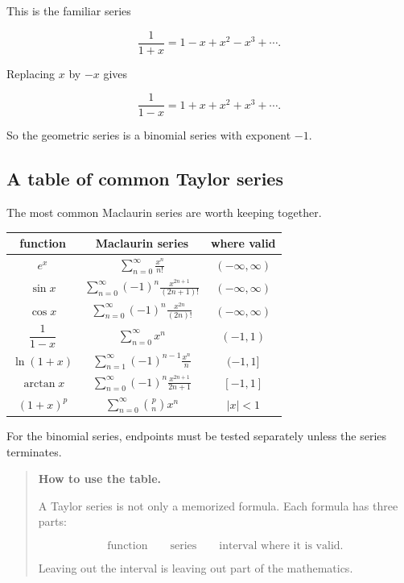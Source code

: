 This is the familiar series

\[
\frac1{1+x}=1-x+x^2-x^3+\cdots.
\]

Replacing \(x\) by \(-x\) gives

\[
\frac1{1-x}=1+x+x^2+x^3+\cdots.
\]

So the geometric series is a binomial series with exponent \(-1\).

\subsection{A table of common Taylor series}
\label{subsec:common-taylor-series-table}

The most common Maclaurin series are worth keeping together.

\begin{center}
\renewcommand{\arraystretch}{1.7}
\begin{tabular}{c|c|c}
\textbf{function} & \textbf{Maclaurin series} & \textbf{where valid} \\ \hline
\(e^x\) &
\(\displaystyle \sum_{n=0}^{\infty}\frac{x^n}{n!}\) &
\((-\infty,\infty)\) \\

\(\sin x\) &
\(\displaystyle \sum_{n=0}^{\infty}(-1)^n\frac{x^{2n+1}}{(2n+1)!}\) &
\((-\infty,\infty)\) \\

\(\cos x\) &
\(\displaystyle \sum_{n=0}^{\infty}(-1)^n\frac{x^{2n}}{(2n)!}\) &
\((-\infty,\infty)\) \\

\(\dfrac1{1-x}\) &
\(\displaystyle \sum_{n=0}^{\infty}x^n\) &
\((-1,1)\) \\

\(\ln(1+x)\) &
\(\displaystyle \sum_{n=1}^{\infty}(-1)^{n-1}\frac{x^n}{n}\) &
\((-1,1]\) \\

\(\arctan x\) &
\(\displaystyle \sum_{n=0}^{\infty}(-1)^n\frac{x^{2n+1}}{2n+1}\) &
\([-1,1]\) \\

\((1+x)^p\) &
\(\displaystyle \sum_{n=0}^{\infty}\binom{p}{n}x^n\) &
\(|x|<1\)
\end{tabular}
\end{center}

For the binomial series, endpoints must be tested separately unless the series
terminates.

\begin{quote}
\textbf{How to use the table.}

A Taylor series is not only a memorized formula.  Each formula has three parts:

\[
\text{function}
\qquad
\text{series}
\qquad
\text{interval where it is valid}.
\]

Leaving out the interval is leaving out part of the mathematics.
\end{quote}

